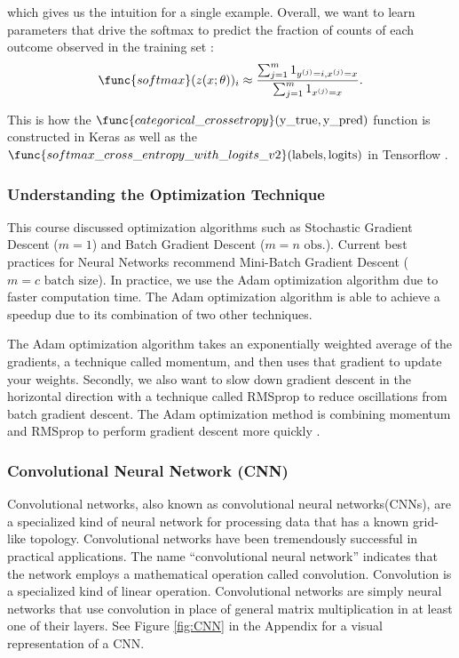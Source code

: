 \documentclass[11pt]{article}
\begin{document}
which gives us the intuition for a single example. Overall, we want to learn
parameters that drive the softmax to predict the fraction of counts of each
outcome observed in the training set \cite{Goodfellow-et-al-2016}:
\begin{equation}
  \func{softmax}(z(x;\theta))_i \approx \frac{\sum_{j=1}^m 1_{y^{(j)} = i,
      x^{(j)} = x}}{\sum_{j=1}^m 1_{x^{(j)} = x}}.
\end{equation}

This is how the $\func{categorical\_crossetropy}(\text{y\_true}, \text{y\_pred})$ function is constructed in Keras \cite{chollet2015keras} as well as the
$\func{softmax\_cross\_entropy\_with\_logits\_v2}(\text{labels}, \text{logits})$ in Tensorflow \cite{tensorflow2015-whitepaper}. 

\subsubsection{Understanding the Optimization Technique}

This course discussed optimization algorithms such as Stochastic Gradient
Descent ($m =1$) and Batch Gradient Descent ($m=n \text{ obs.}$). Current
best practices for Neural Networks recommend Mini-Batch Gradient Descent
($m = c \text{ batch size}$). In practice, we use the Adam optimization
algorithm due to faster computation time. The Adam optimization algorithm
is able to achieve a speedup due to its combination of two other techniques.

The Adam optimization algorithm takes an exponentially weighted average of
the gradients, a technique called momentum, and then uses that gradient to
update your weights. Secondly, we also want to slow down gradient descent in
the horizontal direction with a technique called RMSprop to reduce
oscillations from batch gradient descent. The Adam optimization method is
combining momentum and RMSprop to perform gradient descent more quickly
\cite{DeepLear51:online}.

\subsubsection{Convolutional Neural Network (CNN)}

Convolutional networks, also known as convolutional neural networks(CNNs),
are a specialized kind of neural network for processing data that has a
known grid-like topology. Convolutional networks have been tremendously
successful in practical applications. The name “convolutional neural network”
indicates that the network employs a mathematical operation called
convolution. Convolution is a specialized kind of linear operation.
Convolutional networks are simply neural networks that use convolution
in place of general matrix multiplication in at least one of their layers. See
Figure \ref{fig:CNN} in the Appendix for a visual representation of a CNN.
\end{document}
